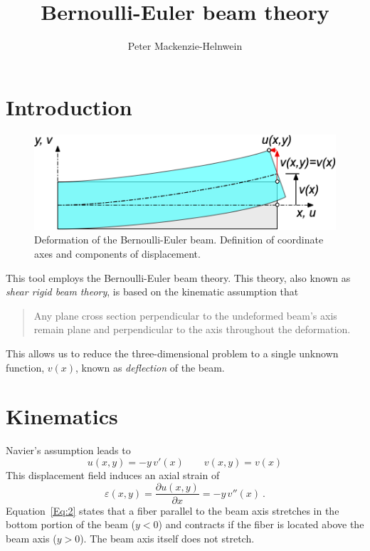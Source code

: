 \documentclass[11pt, oneside]{article}   	%
\title{Bernoulli-Euler beam theory}
\author{Peter Mackenzie-Helnwein}
\begin{document}
\maketitle

\tableofcontents

\section{Introduction}
\begin{figure}[h]
	\begin{center}
		\includegraphics[scale=0.50]{beam.png}
		\caption{Deformation of the Bernoulli-Euler beam. Definition of coordinate axes and components of displacement.}
	\end{center}
	\label{Fig:1}
\end{figure}
This tool employs the Bernoulli-Euler beam theory.  This theory, also known as \emph{shear rigid beam theory}, is based on the kinematic assumption  that
\begin{quote}
   Any plane cross section perpendicular to the undeformed beam's axis remain plane and perpendicular to the axis throughout the deformation.
\end{quote}
This allows us to reduce the three-dimensional problem to a single unknown function, $v(x)$, known as \emph{deflection} of the beam.

\section{Kinematics}
Navier's assumption leads to
\begin{equation}
	u(x,y) = -y \,v'(x)
	\qquad
	v(x,y) = v(x)
	\label{Eq:1}
\end{equation}
This displacement field induces an axial strain of
\begin{equation}
	\varepsilon(x,y) = \frac{\partial u(x,y)}{\partial x} = -y\, v''(x) ~.
	\label{Eq:2}
\end{equation}
Equation~\eqref{Eq:2} states that a fiber parallel to the beam axis stretches in the bottom portion of the beam ($y<0$) and contracts if the fiber is located above the beam axis ($y>0$).  The beam axis itself  does not stretch.
\end{document}
